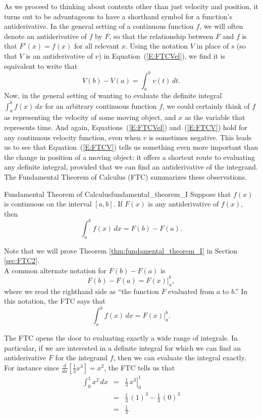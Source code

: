 As we proceed to thinking about contexts other than just velocity and position, it turns out to be advantageous to have a shorthand symbol for a function's antiderivative.  In the general setting of a continuous function $f$, we will often denote an antiderivative of $f$ by $F$, so that the relationship between $F$ and $f$ is that $F'(x) = f(x)$ for all relevant $x$.  Using the notation $V$ in place of $s$ (so that $V$ is an antiderivative of $v$) in Equation~(\ref{E:FTCVel}), we find it is equivalent to write that
\begin{equation} \label{E:FTCV}
V(b) - V(a) = \int_a^b v(t) \, dt.
\end{equation}
 Now, in the general setting of wanting to evaluate the definite integral $\int_a^b f(x) \, dx$ for an arbitrary continuous function $f$, we could certainly think of $f$ as representing the velocity of some moving object, and $x$ as the variable that represents time.  And again, Equations~(\ref{E:FTCVel}) and~(\ref{E:FTCV}) hold for any continuous velocity function, even when $v$ is sometimes negative.   This leads us to see that Equation~(\ref{E:FTCV}) tells us something even more important than the change in position of a moving object: it offers a shortcut route to evaluating any definite integral, provided that we can find an antiderivative of the integrand.  The Fundamental Theorem of Calculus (FTC)  summarizes these observations.
 
 \begin{theorem}{Fundamental Theorem of Calculus}{fundamental_theorem_I}
 Suppose that $f(x)$ is
 continuous on the interval $[a,b]$. If $F(x)$ is any antiderivative of
 $f(x)$, then 
 $$
   \int_a^b f(x)\,dx = F(b)-F(a).
 $$
 \end{theorem}
 
Note that we will prove Theorem \ref{thm:fundamental_theorem_I} in Section \ref{sec:FTC2}. \\ 

A common alternate notation for $F(b) - F(a)$ is 
$$F(b) - F(a) = \left.  F(x) \right|_a^b,$$
where we read the righthand side as ``the function $F$ evaluated from $a$ to $b$.''  In this notation, the FTC says that
$$\int_a^b f(x) \, dx = \left. F(x) \right|_a^b.$$

The FTC opens the door to evaluating exactly a wide range of integrals.  In particular, if we are interested in a definite integral for which we can find an antiderivative $F$ for the integrand $f$, then we can evaluate the integral exactly.  For instance since $\frac{d}{dx}[\frac{1}{3}x^3] = x^2$, the FTC tells us that
\begin{eqnarray*}
	\int_0^1 x^2 \, dx & = & \left. \frac{1}{3} \, x^3 \right|_0^1 \\
				& = & \frac{1}{3} \, (1)^3 - \frac{1}{3} \, (0)^3 \\
				& = & \frac{1}{3}.
\end{eqnarray*}

